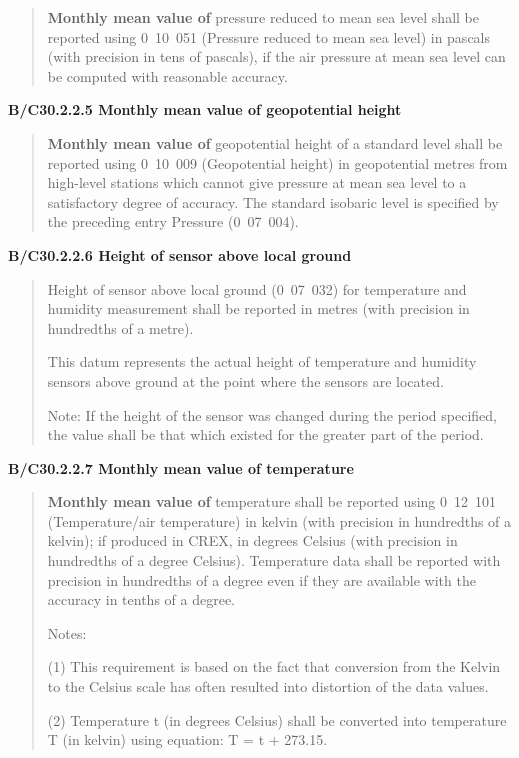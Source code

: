 \begin{quote}
\textbf{Monthly mean value of} pressure reduced to mean sea level shall be reported using 0~10~051 (Pressure reduced to mean sea level) in pascals (with precision in tens of pascals), if the air pressure at mean sea level can be computed with reasonable accuracy.
\end{quote}

\textbf{B/C30.2.2.5 Monthly mean value of geopotential height}

\begin{quote}
\textbf{Monthly mean value of} geopotential height of a standard level shall be reported using 0~10~009 (Geopotential height) in geopotential metres from high-level stations which cannot give pressure at mean sea level to a satisfactory degree of accuracy. The standard isobaric level is specified by the preceding entry Pressure (0~07~004).
\end{quote}

\textbf{B/C30.2.2.6 Height of sensor above local ground}

\begin{quote}
Height of sensor above local ground (0~07~032) for temperature and humidity measurement shall be reported in metres (with precision in hundredths of a metre).

This datum represents the actual height of temperature and humidity sensors above ground at the point where the sensors are located.

Note: If the height of the sensor was changed during the period specified, the value shall be that which existed for the greater part of the period.
\end{quote}

\textbf{B/C30.2.2.7 Monthly mean value of temperature}

\begin{quote}
\textbf{Monthly mean value of} temperature shall be reported using 0~12~101 (Temperature/air temperature) in kelvin (with precision in hundredths of a kelvin); if produced in CREX, in degrees Celsius (with precision in hundredths of a degree Celsius). Temperature data shall be reported with precision in hundredths of a degree even if they are available with the accuracy in tenths of a degree.

Notes:

(1) This requirement is based on the fact that conversion from the Kelvin to the Celsius scale has often resulted into distortion of the data values.

(2) Temperature t (in degrees Celsius) shall be converted into temperature T (in kelvin) using equation: T = t + 273.15.
\end{quote}

